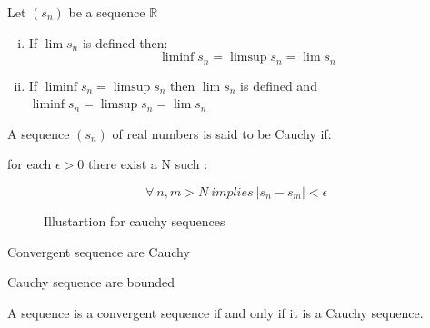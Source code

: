 \documentclass{notes}
\begin{document}
\begin{theorem}{}
	Let $(s_n)$ be a sequence $\mathbb{R}$
	\begin{enumerate}[(i)]
		\item 
		If $\lim s_n$ is defined then:
		$$\liminf s_n = \limsup s_n = \lim s_n$$
		\item
		If $\liminf s_n = \limsup s_n$ then $\lim s_n$ is defined and $\liminf s_n = \limsup s_n = \lim s_n$
	\end{enumerate}
\end{theorem}
\begin{definition}{}\cite{wikicauchy}
	A sequence $(s_n)$ of real numbers is said to be Cauchy if:
	
	for each $\epsilon>0$ there exist a N such  :
	
	\begin{equation*}
	\forall\ n,m>N\ \mathit{implies}\ |s_n - s_m|<\epsilon
	\end{equation*}
\end{definition}
\begin{figure}[hbt!]
	
	\qquad
	\caption{Illustartion for cauchy sequences}%
\end{figure}
\begin{lemma}{}
	Convergent sequence are Cauchy
\end{lemma}
\begin{lemma}{}
	Cauchy sequence are bounded
\end{lemma}
\begin{theorem}{}
	A sequence is a convergent sequence if and only if it is a Cauchy
	sequence.
\end{theorem}
\end{document}
